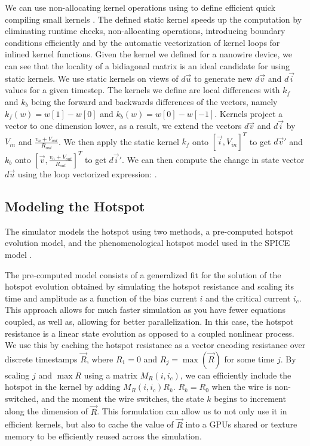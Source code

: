 We can use non-allocating kernel operations using  to define efficient
quick compiling small kernels \cite{StaticKernels}. 
The defined static kernel speeds up the computation by eliminating
runtime checks, non-allocating operations, introducing boundary conditions efficiently and 
by the automatic vectorization of kernel loops for inlined kernel functions. Given the kernel
we defined for a nanowire device, we can see that the locality of a bidiagonal matrix is an ideal
candidate for using static kernels. We use static kernels on views of $d\vec u$ to generate
new $d\vec v$ and $d\vec i$ values for a given timestep. The kernels we define are local differences
with $k_f$ and $k_b$ being the forward and backwards differences of the vectors, namely $k_f(w)=w[1]-w[0]$
and $k_b(w)=w[0]-w[-1]$. Kernels project a vector to one dimension lower, as a result, we extend the
vectors $d\vec v$ and $d\vec i$ by $V_{in}$ and $\frac{v_n+V_{out}}{R_{out}}$. We then apply 
the static kernel $k_f$ onto $[\vec i, V_{in}]^T$ to get $d\vec v'$ and 
$k_b$ onto $[\vec v, \frac{v_n+V_{out}}{R_{out}}]^T$ to get $d\vec i'$. We can then compute the change
in state vector $d\vec u$ using the loop vectorized expression: .


\subsection{Modeling the Hotspot}

The simulator models the hotspot using two methods, a pre-computed hotspot evolution
model, and the phenomenological hotspot model used in the SPICE model \cite{karl_spice, phen_model}. 

The pre-computed model consists of a generalized fit for the solution of the hotspot evolution
obtained by simulating the hotspot resistance and scaling its time and amplitude as a function
of the bias current $i$ and the critical current $i_c$. This approach allows for much faster simulation as you have
fewer equations coupled, as well as, allowing for better parallelization. In this case, the
hotspot resistance is a linear state evolution as opposed to a coupled nonlinear process. We use
this by caching the hotspot resistance as a vector encoding resistance over discrete timestamps
$\vec R$, where $R_1=0$ and $R_{j} = \max(\vec R)$ for some time $j$. By scaling $j$ and $\max R$ using
a matrix $M_R(i, i_c)$, we can efficiently include the hotspot in the kernel by adding 
$M_R(i, i_c) R_k$. $R_k=R_0$ when the wire is non-switched, and the moment the wire switches,
the state $k$ begins to increment along the dimension of $\vec R$. This formulation can allow
us to not only use it in efficient kernels, but also to cache the value of $\vec R$ 
into a GPUs shared or texture memory to be efficiently reused across the simulation.

